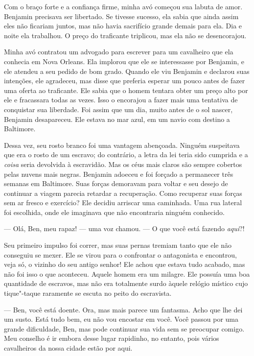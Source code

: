 Com o braço forte e a confiança firme,
minha avó começou sua labuta de amor. Benjamin precisava ser libertado.
Se tivesse sucesso, ela sabia que ainda assim eles não ficariam juntos,
mas não havia sacrifício grande demais para ela. Dia e noite ela
trabalhou. O preço do traficante triplicou, mas ela não se desencorajou.

Minha avó contratou um advogado para
escrever para um cavalheiro que ela conhecia em Nova Orleans. Ela
implorou que ele se interessasse por Benjamin, e ele atendeu a seu
pedido de bom grado. Quando ele viu Benjamin e declarou suas intenções,
ele agradeceu, mas disse que preferia esperar um pouco antes de fazer
uma oferta ao traficante. Ele sabia que o homem tentara obter um preço
alto por ele e fracassara todas as vezes. Isso o encorajou a fazer mais
uma tentativa de conquistar sua liberdade. Foi assim que um dia, muito
antes de o sol nascer, Benjamin desapareceu. Ele estava no mar azul, em
um navio com destino a Baltimore.

Dessa vez, seu rosto branco foi uma
vantagem abençoada. Ninguém suspeitava que era o rosto de um escravo; do
contrário, a letra da lei teria sido cumprida e a \emph{coisa} seria
devolvida à escravidão. Mas os céus mais claros são sempre cobertos
pelas nuvens mais negras. Benjamin adoeceu e foi forçado a permanecer
três semanas em Baltimore. Suas forças demoravam para voltar e seu
desejo de continuar a viagem parecia retardar a recuperação. Como
recuperar suas forças sem ar fresco e exercício? Ele decidiu arriscar
uma caminhada. Uma rua lateral foi escolhida, onde ele imaginava que não
encontraria ninguém conhecido.

--- Olá, Ben, meu rapaz! --- uma voz chamou. --- O que você está fazendo
\emph{aqui}?!

Seu primeiro impulso foi correr, mas
suas pernas tremiam tanto que ele não conseguiu se mexer. Ele se virou
para o confrontar o antagonista e encontrou, veja só, o vizinho do seu
antigo senhor! Ele achou que estava tudo acabado, mas não foi isso o que
aconteceu. Aquele homem era um milagre. Ele possuía uma boa quantidade
de escravos, mas não era totalmente surdo àquele relógio místico cujo
tique"-taque raramente se escuta no peito do escravista.

--- Ben, você está doente. Ora, mas
mais parece um fantasma. Acho que lhe dei um susto. Está tudo bem, eu
não vou encostar em você. Você passou por uma grande dificuldade, Ben,
mas pode continuar sua vida sem se preocupar comigo. Meu conselho é ir
embora desse lugar rapidinho, no entanto, pois vários cavalheiros da
nossa cidade estão por aqui.


